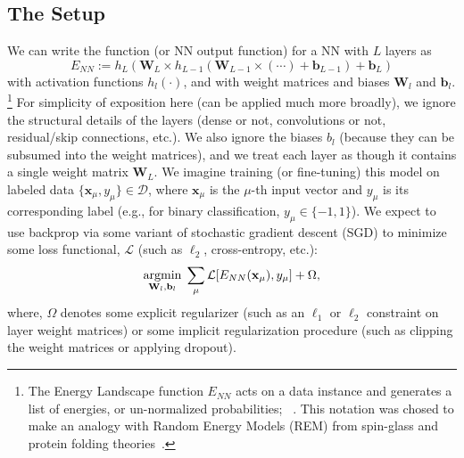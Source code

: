 \subsection{The \HTSR Setup}
\label{sxn:htsr_setup}

We can write the \EnergyLandscape function 
(or NN output function) for a 
NN with $L$ layers as
\begin{equation}
\label{eqn:dnn_energy}
E_{NN}:=h_{L}(\mathbf{W}_{L}\times h_{L-1}(\mathbf{W}_{L-1}\times(\cdots)+\mathbf{b}_{L-1})+\mathbf{b}_{L}) 
\end{equation}
with activation functions $h_{l}(\cdot)$, and with weight matrices and biases $\mathbf{W}_{l}$ and $\mathbf{b}_{l}$.%
\footnote{The Energy Landscape function $E_{NN}$ acts on a data instance and generates a list of energies, or un-normalized probabilities;
~\cite{MM18_TR_JMLRversion}.
This notation was chosed to make an analogy with Random Energy Models (REM) from spin-glass and protein folding theories~\cite{xxx1,xxx2}.
}
For simplicity of exposition here (\HTSR can be applied much more broadly), we ignore the structural details of the layers (dense or not, convolutions or not, residual/skip connections, etc.).
We also ignore the biases $b_{l}$ (because they can be subsumed into the weight matrices),
and we treat each layer as though it contains a single weight matrix $\mathbf{W}_{L}$.
We imagine training (or fine-tuning) this model on labeled data $\{\mathbf{x}_{\mu},y_{\mu}\}\in\mathcal{D}$, where $ \mathbf{x}_\mu $ is the $\mu$-th input vector and $y_\mu$ is its corresponding label (e.g., for binary classification, $y_{\mu}\in\{-1,1\}$).
We expect to use backprop via some variant of stochastic gradient descent (SGD) to minimize some loss functional, $\mathcal{L}$ (such as $\ell_2$, cross-entropy, etc.):  
\begin{equation}
\underset{\mathbf{W}_{l},\mathbf{b}_{l}}{\text{argmin}}\;\sum_{\mu}\mathcal{L}[E_{NN}(\mathbf{x}_{\mu}),y_{\mu}]+\Omega ,
\label{eqn:dnn_opt}
\end{equation}
where, $\Omega$ denotes some explicit regularizer (such as an $\ell_1$ or $\ell_2$ constraint on layer weight matrices) or some implicit regularization procedure (such as clipping the weight matrices or applying dropout).

